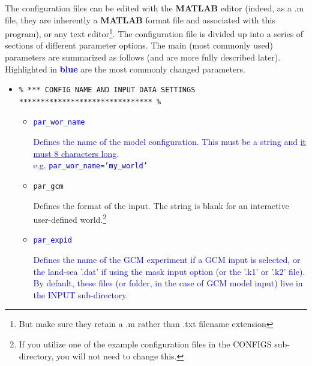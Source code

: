 The configuration files can be edited with the \textbf{MATLAB} editor (indeed, as a \textsf{\footnotesize .m} file, they are inherently a \textbf{MATLAB} format file and associated with this program), or any  text editor\footnote{But make sure they retain a \textsf{\footnotesize .m} rather than \textsf{\footnotesize .txt} filename extension}. The configuration file is divided up into a series of sections of different parameter options. The main (most commonly used) parameters are summarized as follows (and are more fully described later). Highlighted in \textcolor{blue}{\textbf{blue}} are the most commonly changed parameters.

\vspace{2mm}

\begin{itemize}

\vspace{1mm}
\item []
\small\vspace{-2pt}\begin{verbatim}
% *** CONFIG NAME AND INPUT DATA SETTINGS ******************************* %
\end{verbatim}\vspace{-2pt}\normalsize

\begin{itemize}[noitemsep]

\vspace{1mm}
\item [] \textcolor{blue}{\texttt{par\_wor\_name}}

\textcolor{blue}{Defines the name of the model configuration. This must be a string and \uline{it must 8 characters long}.
\\e.g. \texttt{par\_wor\_name='my\_world'}}

\vspace{1mm}
\item [] \texttt{par\_gcm}

Defines the format of the input. The string is blank for an interactive user-defined world.\footnote{If you utilize one of the example configuration files in the \textsf{\footnotesize CONFIGS} sub-directory, you will not need to change this.}

\vspace{1mm}
\item \textcolor{blue}{\texttt{par\_expid}}

\textcolor{blue}{Defines the name of the GCM experiment if a GCM input is selected, or the land-sea '\textsf{\footnotesize .dat}' if using the mask input option (or the '\textsf{\footnotesize .k1}' or '\textsf{\footnotesize .k2}' file). By default, these files (or folder, in the case of GCM model input) live in the \textsf{\footnotesize INPUT} sub-directory.}


\end{itemize}
\end{itemize}

